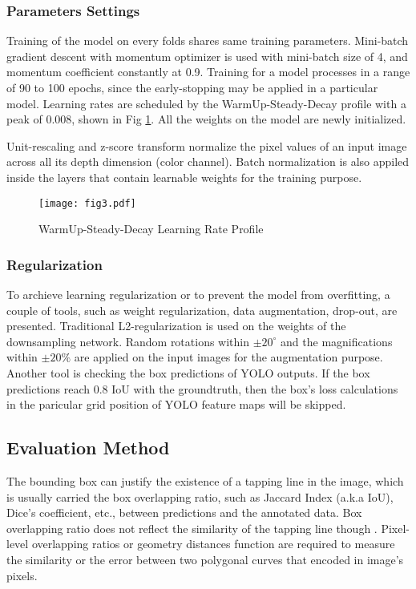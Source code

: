 \documentclass[default,pdflatex,iicol]{sn-jnl}%
\begin{document}
\subsubsection{Parameters Settings}\label{subsubsec-trainingparams}
Training of the model on every folds shares same training parameters. Mini-batch gradient descent with momentum optimizer is used with mini-batch size of 4, and momentum coefficient constantly at 0.9. Training for a model processes in a range of 90 to 100 epochs, since the early-stopping may be applied in a particular model. Learning rates are scheduled by the WarmUp-Steady-Decay profile with a peak of 0.008, shown in Fig \ref{fig3-LR}. All the weights on the model are newly initialized. 

Unit-rescaling and z-score transform normalize the pixel values of an input image across all its depth dimension (color channel). Batch normalization is also appiled inside the layers that contain learnable weights for the training purpose.

\begin{figure}[h]%
\centering
\texttt{[image: fig3.pdf]}
\caption{WarmUp-Steady-Decay Learning Rate Profile}\label{fig3-LR}
\end{figure}

\subsubsection{Regularization}
To archieve learning regularization or to prevent the model from overfitting, a couple of tools, such as weight regularization, data augmentation, drop-out, are presented. Traditional L2-regularization is used on the weights of the downsampling network. Random rotations within $\pm20^\circ$ and the magnifications within $\pm20\%$ are applied on the input images for the augmentation purpose. Another tool is checking the box predictions of YOLO outputs. If the box predictions reach 0.8 IoU with the groundtruth, then the box's loss calculations in the paricular grid position of YOLO feature maps will be skipped.

\subsection{Evaluation Method}
The bounding box can justify the existence of a tapping line in the image, which is usually carried the box overlapping ratio, such as Jaccard Index (a.k.a IoU), Dice's coefficient, etc., between predictions and the annotated data. Box overlapping ratio does not reflect the similarity of the tapping line though \cite{Wongtanawijit_2021}. Pixel-level overlapping ratios or geometry distances function are required to measure the similarity or the error between two polygonal curves that encoded in image's pixels.
\end{document}
